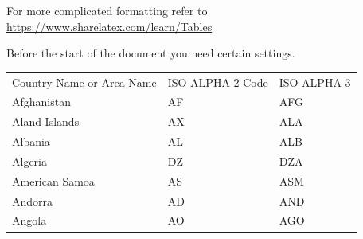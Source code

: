 \documentclass[tog]{acmsiggraph}
\renewcommand{\arraystretch}{2.5}
\begin{document}
For more complicated formatting refer to \url{https://www.sharelatex.com/learn/Tables}

Before the start of the document you need certain settings.
%


\begin{table}[h]
\begin{tabular}{ |s|p{0.05\textwidth}|p{0.05\textwidth}|  }
	\hline
	  \\
	\hline
	Country Name    or Area Name& ISO ALPHA 2 Code &ISO ALPHA 3 \\
	\hline
	Afghanistan & AF &AFG \\
	Aland Islands & AX & ALA \\
	Albania   &AL & ALB \\
	Algeria  &DZ & DZA \\
	American Samoa & AS & ASM \\
	Andorra & AD &  AND    \\
	Angola & AO & AGO \\
	\hline
\end{tabular}
\end{table}
\end{document}
